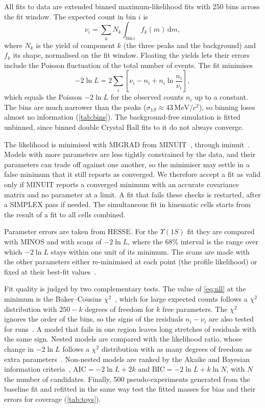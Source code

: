\documentclass[a4paper,11pt]{article}
\newcommand{\MeVcc}{\ensuremath{\mathrm{MeV}/c^2}}
\newcommand{\Ups}[1]{\ensuremath{\Upsilon(#1)}}               %
\begin{document}
All fits to data are extended binned maximum-likelihood fits with 250 bins across the fit window.
The expected count in bin $i$ is
\begin{equation}
    \nu_i = \sum_k N_k \int_{\mathrm{bin}\,i} f_k(m)\,\mathrm{d}m ,
\end{equation}
where $N_k$ is the yield of component $k$ (the three peaks and the background) and $f_k$ its shape, normalised on the fit window.
Floating the yields lets their errors include the Poisson fluctuation of the total number of events.
The fit minimises
\begin{equation}
    -2\ln L = 2\sum_i \left[\nu_i - n_i + n_i \ln\frac{n_i}{\nu_i}\right],
    \label{eq:nll}
\end{equation}
which equals the Poisson $-2\ln L$ for the observed counts $n_i$ up to a constant.
The bins are much narrower than the peaks ($\sigma_{1S} \approx 43\,\MeVcc$), so binning loses almost no information (\cref{tab:bins}).
The background-free simulation is fitted unbinned, since binned double Crystal Ball fits to it do not always converge.

The likelihood is minimised with MIGRAD from MINUIT~\cite{James:1975dr}, through iminuit~\cite{dembinski2026iminuit}.
Models with more parameters are less tightly constrained by the data, and their parameters can trade off against one another, so the minimiser may settle in a false minimum that it still reports as converged.
We therefore accept a fit as valid only if MINUIT reports a converged minimum with an accurate covariance matrix and no parameter at a limit.
A fit that fails these checks is restarted, after a SIMPLEX pass if needed.
The simultaneous fit in kinematic cells starts from the result of a fit to all cells combined.

Parameter errors are taken from HESSE.
For the \Ups{1S} fit they are compared with MINOS and with scans of $-2\ln L$, where the 68\% interval is the range over which $-2\ln L$ stays within one unit of its minimum.
The scans are made with the other parameters either re-minimised at each point (the profile likelihood) or fixed at their best-fit values~\cite{Cowan:2024stat}.

Fit quality is judged by two complementary tests.
The value of \cref{eq:nll} at the minimum is the Baker--Cousins $\chi^2$~\cite[Eq.~(40.16)]{Cowan:2024stat}, which for large expected counts follows a $\chi^2$ distribution with $250 - k$ degrees of freedom for $k$ free parameters.
The $\chi^2$ ignores the order of the bins, so the signs of the residuals $n_i - \nu_i$ are also tested for runs~\cite{wiki:runs}.
A model that fails in one region leaves long stretches of residuals with the same sign.
Nested models are compared with the likelihood ratio, whose change in $-2\ln L$ follows a $\chi^2$ distribution with as many degrees of freedom as extra parameters~\cite{Cowan:2024stat}.
Non-nested models are ranked by the Akaike and Bayesian information criteria~\cite{wiki:AIC,wiki:BIC}, $\mathrm{AIC} = -2\ln L + 2k$ and $\mathrm{BIC} = -2\ln L + k\ln N$, with $N$ the number of candidates.
Finally, 500 pseudo-experiments generated from the baseline fit and refitted in the same way test the fitted masses for bias and their errors for coverage (\cref{tab:toys}).
\end{document}
